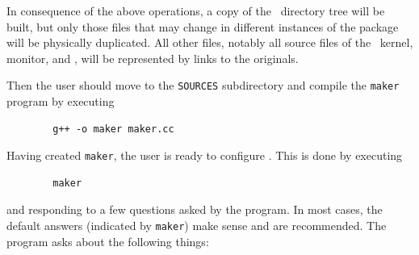 In consequence of the above operations, a copy of the \smurphtt\ directory
tree will be built, but only those files that may change in different
instances of the package will be physically duplicated.
All other files, notably all source files of the \smurph\ kernel,
monitor, and \dsd, will be represented by links to the originals.

Then the user should move to the {\tt SOURCES} subdirectory
and compile the {\tt maker} program by executing
\begin{verbatim}
        g++ -o maker maker.cc
\end{verbatim}

Having created {\tt maker}, the user is ready to configure \smurph.
This is done by executing
\begin{verbatim}
        maker
\end{verbatim}
and responding to a few questions asked by the program.
In most cases, the default answers (indicated by {\tt maker}) make sense
and are recommended.
The program asks about the following things:

